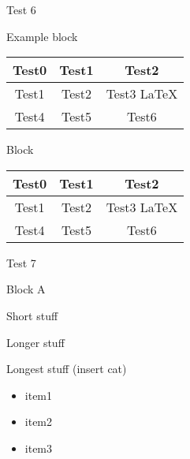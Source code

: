 \documentclass{beamer}
\begin{document}
        \begin{frame}{Test 6}

            \begin{exampleblock}{Example block}
                \smallskip 

                \begin{tabular}{|c|c|c|}
                \hline
                \textbf{Test0} & \textbf{Test1} & \textbf{Test2} \\
                \hline
                Test1 & Test2 & Test3 \LaTeX  \\
                \hline
                Test4 & Test5& Test6\\
                \hline
                \end{tabular}
            \end{exampleblock}

            \begin{block}{Block}
                \smallskip 

                \begin{tabular}{|c|c|c|}
                \hline
                \textbf{Test0} & \textbf{Test1} & \textbf{Test2} \\
                \hline
                Test1 & Test2 & Test3 \LaTeX  \\
                \hline
                Test4 & Test5& Test6\\
                \hline
                \end{tabular}
            \end{block}
        \end{frame}

	 \begin{frame}{Test 7}
            
         	\begin{block}{Block A}
            
                \begin{description}
                    \item[short] Short stuff
                    \item[long] Longer stuff
                    \item[longest label] Longest stuff (insert cat)
                \end{description}
            
                \begin{itemize}
                    \item item1
                    \item item2
                    \item item3
                \end{itemize}  
            \end{block}

        \end{frame}
\end{document}
